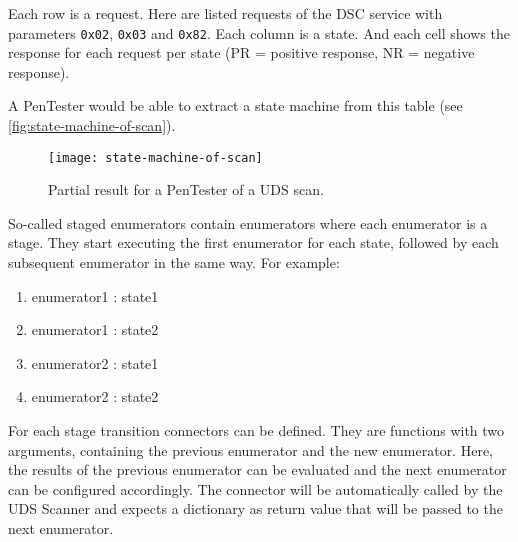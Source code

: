 Each row is a request. Here are listed requests of the DSC service with parameters \texttt{0x02}, \texttt{0x03} and \texttt{0x82}. Each column is a state. And each cell shows the response for each request per state (PR = positive response, NR = negative response).

A PenTester would be able to extract a state machine from this table (see \autoref{fig:state-machine-of-scan}).

\begin{figure}[H]
    \centering
    \texttt{[image: state-machine-of-scan]}
    \caption{Partial result for a PenTester of a UDS scan.}
    \label{fig:state-machine-of-scan}
\end{figure}

So-called staged enumerators contain enumerators where each enumerator is a stage. They start executing the first enumerator for each state, followed by each subsequent enumerator in the same way. For example:
\begin{enumerate}
    \item enumerator1 : state1
    \item enumerator1 : state2
    \item enumerator2 : state1
    \item enumerator2 : state2
\end{enumerate}

For each stage transition connectors can be defined. They are functions with two arguments, containing the previous enumerator and the new enumerator. Here, the results of the previous enumerator can be evaluated and the next enumerator can be configured accordingly. The connector will be automatically called by the UDS Scanner and expects a dictionary as return value that will be passed to the next enumerator. 


